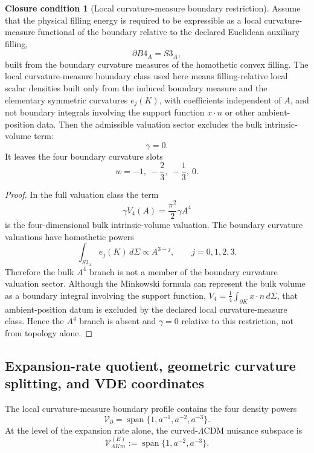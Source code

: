 \documentclass[11pt,a4paper]{article}
\def\Bfour{B4}%
\def\Sthree{S3}%
\def\dd{d}%
\numberwithin{equation}{section}
\theoremstyle{definition}
\newtheorem{closurecondition}[criterion]{Closure condition}
\theoremstyle{plain}
\theoremstyle{remark}
\newcommand{\Sthree}{S^3}
\newcommand{\Bfour}{B^4}
\newcommand{\dd}{\mathrm{d}}
\begin{document}
\begin{closurecondition}[Local curvature-measure boundary restriction]
Assume that the physical filling energy is required to be expressible as a local curvature-measure functional of the boundary relative to the declared Euclidean auxiliary filling,
\begin{equation}
\partial\Bfour_A=\Sthree_A,
\end{equation}
built from the boundary curvature measures of the homothetic convex filling. The local curvature-measure boundary class used here means filling-relative local scalar densities built only from the induced boundary measure and the elementary symmetric curvatures \(e_j(K)\), with coefficients independent of \(A\), and not boundary integrals involving the support function \(x\cdot n\) or other ambient-position data. Then the admissible valuation sector excludes the bulk intrinsic-volume term:
\begin{equation}
\gamma=0.
\end{equation}
It leaves the four boundary curvature slots
\begin{equation}
w=-1,\ -\frac{2}{3},\ -\frac{1}{3},\ 0.
\end{equation}
\end{closurecondition}
\begin{proof}
In the full valuation class the term
\begin{equation}
\gamma V_4(A)=\frac{\pi^2}{2}\gamma A^4
\end{equation}
is the four-dimensional bulk intrinsic-volume valuation. The boundary curvature valuations have homothetic powers
\begin{equation}
\int_{\Sthree_A}e_j(K)\,\dd\Sigma\propto A^{3-j},
\qquad j=0,1,2,3.
\end{equation}
Therefore the bulk \(A^4\) branch is not a member of the boundary curvature valuation sector. Although the Minkowski formula can represent the bulk volume as a boundary integral involving the support function, \(V_4=\tfrac14\int_{\partial K}x\cdot n\,\dd\Sigma\), that ambient-position datum is excluded by the declared local curvature-measure class. Hence the \(A^4\) branch is absent and \(\gamma=0\) relative to this restriction, not from topology alone.
\end{proof}


\subsection{Expansion-rate quotient, geometric curvature splitting, and VDE coordinates}
The local curvature-measure boundary profile contains the four density powers
\begin{equation}
\mathcal V_{\partial}=\operatorname{span}\{1,a^{-1},a^{-2},a^{-3}\}.
\end{equation}
At the level of the expansion rate alone, the curved-\(\Lambda\)CDM nuisance subspace is
\begin{equation}
\mathcal V_{\Lambda Km}^{(E)}
:=\operatorname{span}\{1,a^{-2},a^{-3}\}.
\end{equation}
\end{document}

